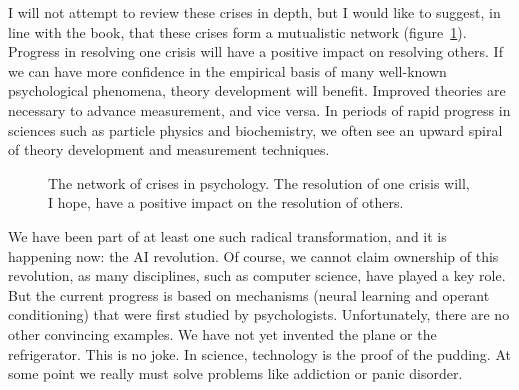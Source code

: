 \documentclass[
  a4paper,
  DIV=11,
  numbers=noendperiod,
  oneside]{scrreprt}
\begin{document}
I will not attempt to review these crises in depth, but I would like to
suggest, in line with the book, that these crises form a mutualistic
network (figure~\ref{fig-ch8-extra}). Progress in resolving one crisis
will have a positive impact on resolving others. If we can have more
confidence in the empirical basis of many well-known psychological
phenomena, theory development will benefit. Improved theories are
necessary to advance measurement, and vice versa. In periods of rapid
progress in sciences such as particle physics and biochemistry, we often
see an upward spiral of theory development and measurement techniques.

\begin{figure}


\caption{\label{fig-ch8-extra}The network of crises in psychology. The
resolution of one crisis will, I hope, have a positive impact on the
resolution of others.}

\end{figure}%

We have been part of at least one such radical transformation, and it is
happening now: the AI revolution. Of course, we cannot claim ownership
of this revolution, as many disciplines, such as computer science, have
played a key role. But the current progress is based on mechanisms
(neural learning and operant conditioning) that were first studied by
psychologists. Unfortunately, there are no other convincing examples. We
have not yet invented the plane or the refrigerator. This is no joke. In
science, technology is the proof of the pudding. At some point we really
must solve problems like addiction or panic disorder.
\end{document}
